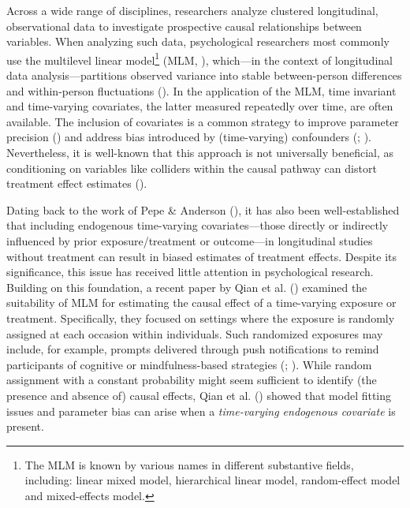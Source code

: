 \documentclass[
  11pt,
  a4paper,
]{article}
\begin{document}
Across a wide range of disciplines, researchers analyze clustered
longitudinal, observational data to investigate prospective causal
relationships between variables. When analyzing such data, psychological
researchers most commonly use the multilevel linear model\footnote{The
  MLM is known by various names in different substantive fields,
  including: linear mixed model, hierarchical linear model,
  random-effect model and mixed-effects model.} (MLM,
), which---in the context
of longitudinal data analysis---partitions observed variance into stable
between-person differences and within-person fluctuations
(). In the
application of the MLM, time invariant and time-varying covariates, the
latter measured repeatedly over time, are often available. The inclusion
of covariates is a common strategy to improve parameter precision
() and address bias
introduced by (time-varying) confounders
(;
). Nevertheless, it is well-known
that this approach is not universally beneficial, as conditioning on
variables like colliders within the causal pathway can distort treatment
effect estimates ().

Dating back to the work of Pepe \& Anderson
(), it has also been well-established that
including endogenous time-varying covariates---those directly or
indirectly influenced by prior exposure/treatment or outcome---in
longitudinal studies without treatment can result in biased estimates of
treatment effects. Despite its significance, this issue has received
little attention in psychological research. Building on this foundation,
a recent paper by Qian et al. () examined
the suitability of MLM for estimating the causal effect of a
time-varying exposure or treatment. Specifically, they focused on
settings where the exposure is randomly assigned at each occasion within
individuals. Such randomized exposures may include, for example, prompts
delivered through push notifications to remind participants of cognitive
or mindfulness-based strategies
(;
). While random assignment
with a constant probability might seem sufficient to identify (the
presence and absence of) causal effects, Qian et al.
() showed that model fitting issues and
parameter bias can arise when a \emph{time-varying endogenous covariate}
is present.
\end{document}
